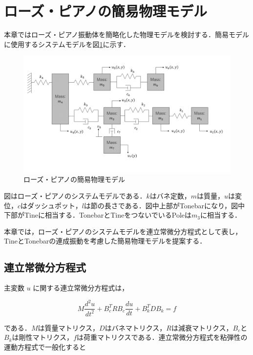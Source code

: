\section{ローズ・ピアノの簡易物理モデル}

本章ではローズ・ピアノ振動体を簡略化した物理モデルを検討する．簡易モデルに使用するシステムモデルを図\ref{fig:簡易モデル}に示す．

\begin{figure}
    \centering
    \includegraphics[width=15cm]{img/system-model.png}
    \caption{ローズ・ピアノの簡易物理モデル}
    \label{fig:簡易モデル}
\end{figure}


図はローズ・ピアノのシステムモデルである．$k$はバネ定数，$m$は質量，$u$は変位，$c$はダッシュポット，$l$は節の長さである．図中上部がTonebarになり，図中下部がTineに相当する．TonebarとTineをつないでいるPoleは$m_3$に相当する．

本章では，ローズ・ピアノのシステムモデルを連立常微分方程式として表し，TineとTonebarの連成振動を考慮した簡易物理モデルを提案する．



\subsection{連立常微分方程式}

主変数 $u$ に関する連立常微分方程式は，

\begin{equation}
    M \frac{d^2 u}{dt^2} + B_c^T R B_c \frac{du}{dt} + B_k^T D B_k = f    
\end{equation}

である．$M$は質量マトリクス，$D$はバネマトリクス，$R$は減衰マトリクス，$B_c$と$B_k$は剛性マトリクス，$f$は荷重マトリクスである．連立常微分方程式を粘弾性の運動方程式で一般化すると

